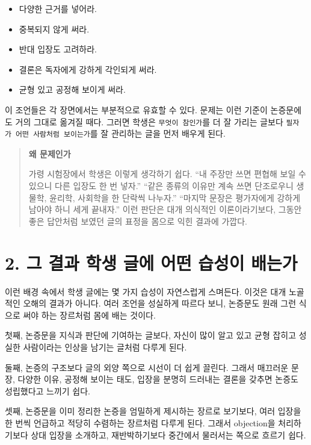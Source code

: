 \begin{itemize}
\tightlist
\item
  다양한 근거를 넣어라.
\item
  중복되지 않게 써라.
\item
  반대 입장도 고려하라.
\item
  결론은 독자에게 강하게 각인되게 써라.
\item
  균형 있고 공정해 보이게 써라.
\end{itemize}

이 조언들은 각 장면에서는 부분적으로 유효할 수 있다. 문제는 이런 기준이 논증문에도 거의 그대로 옮겨질 때다. 그러면 학생은 \texttt{무엇이\ 참인가}를 더 잘 가리는 글보다 \texttt{필자가\ 어떤\ 사람처럼\ 보이는가}를 잘 관리하는 글을 먼저 배우게 된다.

\begin{quote}
\textbf{왜 문제인가}

가령 시험장에서 학생은 이렇게 생각하기 쉽다. ``내 주장만 쓰면 편협해 보일 수 있으니 다른 입장도 한 번 넣자.'' ``같은 종류의 이유만 계속 쓰면 단조로우니 생물학, 윤리학, 사회학을 한 단락씩 나누자.'' ``마지막 문장은 평가자에게 강하게 남아야 하니 세게 끝내자.'' 이런 판단은 대개 의식적인 이론이라기보다, 그동안 좋은 답안처럼 보였던 글의 표정을 몸으로 익힌 결과에 가깝다.
\end{quote}

\section{2. 그 결과 학생 글에 어떤 습성이 배는가}\label{2-uxadf8-uxacb0uxacfc-uxd559uxc0dd-uxae00uxc5d0-uxc5b4uxb5a4-uxc2b5uxc131uxc774-uxbc30uxb294uxac00}

이런 배경 속에서 학생 글에는 몇 가지 습성이 자연스럽게 스며든다. 이것은 대개 노골적인 오해의 결과가 아니다. 여러 조언을 성실하게 따르다 보니, 논증문도 원래 그런 식으로 써야 하는 장르처럼 몸에 배는 것이다.

첫째, 논증문을 지식과 판단에 기여하는 글보다, 자신이 많이 알고 있고 균형 잡히고 성실한 사람이라는 인상을 남기는 글처럼 다루게 된다.

둘째, 논증의 구조보다 글의 외양 쪽으로 시선이 더 쉽게 끌린다. 그래서 매끄러운 문장, 다양한 이유, 공정해 보이는 태도, 입장을 분명히 드러내는 결론을 갖추면 논증도 성립했다고 느끼기 쉽다.

셋째, 논증문을 이미 정리한 논증을 엄밀하게 제시하는 장르로 보기보다, 여러 입장을 한 번씩 언급하고 적당히 수렴하는 장르처럼 다루게 된다. 그래서 objection을 처리하기보다 상대 입장을 소개하고, 재반박하기보다 중간에서 물러서는 쪽으로 흐르기 쉽다.

